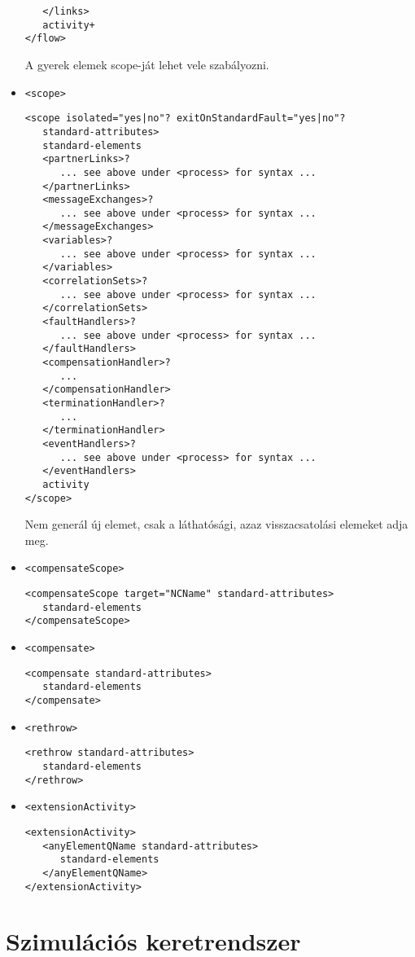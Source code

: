 \documentclass[12pt,a4paper]{book}
\begin{document}
\begin{itemize}
\begin{verbatim}
   </links>
   activity+
</flow>
\end{verbatim} A gyerek elemek scope-ját lehet vele szabályozni.
\item \texttt{<scope>}
\begin{verbatim}
<scope isolated="yes|no"? exitOnStandardFault="yes|no"?
   standard-attributes>
   standard-elements
   <partnerLinks>?
      ... see above under <process> for syntax ...
   </partnerLinks>
   <messageExchanges>?
      ... see above under <process> for syntax ...
   </messageExchanges>
   <variables>?
      ... see above under <process> for syntax ...
   </variables>
   <correlationSets>?
      ... see above under <process> for syntax ...
   </correlationSets>
   <faultHandlers>?
      ... see above under <process> for syntax ...
   </faultHandlers>
   <compensationHandler>?
      ...
   </compensationHandler>
   <terminationHandler>?
      ...
   </terminationHandler>
   <eventHandlers>?
      ... see above under <process> for syntax ...
   </eventHandlers>
   activity
</scope>
\end{verbatim}
Nem generál új elemet, csak a láthatósági, azaz visszacsatolási elemeket adja meg. 
\item \texttt{<compensateScope>}
\begin{verbatim}
<compensateScope target="NCName" standard-attributes>
   standard-elements
</compensateScope>
\end{verbatim}
\item \texttt{<compensate>}
\begin{verbatim}
<compensate standard-attributes>
   standard-elements
</compensate>
\end{verbatim}
\item \texttt{<rethrow>}
\begin{verbatim}
<rethrow standard-attributes>
   standard-elements
</rethrow>
\end{verbatim}
\item \texttt{<extensionActivity>}
\begin{verbatim}
<extensionActivity>
   <anyElementQName standard-attributes>
      standard-elements
   </anyElementQName>
</extensionActivity>
\end{verbatim}
\end{itemize}

\chapter{Szimulációs keretrendszer}
\end{document}
